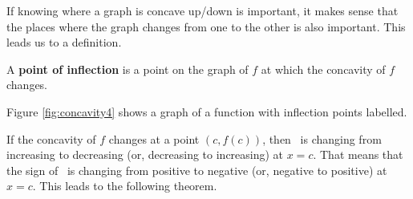 %
%
%



If knowing where a graph is concave up/down is important, it makes sense that the places where the graph changes from one to the other is also important. This leads us to a definition.


{A \textbf{point of inflection} is a point on the graph of $f$ at which the concavity of $f$ changes.
}

Figure \ref{fig:concavity4} shows a graph of a function with inflection points labelled.


If the concavity of $f$ changes at a point $(c,f(c))$, then \fp\ is changing from increasing to decreasing (or, decreasing to increasing) at $x=c$. That means that the sign of \fpp\ is changing from positive to negative (or, negative to positive) at $x=c$.  This leads to the following theorem.

